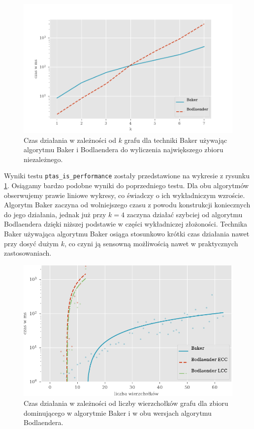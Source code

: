 \documentclass[twoside,a4paper,12pt]{report} %
\theoremstyle{break}
\begin{document}
\begin{figure}[h!]
    \centering
    \includegraphics{wykresy/is_ptas.pdf}
    \caption{Czas działania w zależności od $k$ grafu dla techniki Baker używając algorytmu Baker i Bodlaendera do wyliczenia największego zbioru niezależnego.}
    \label{is_ptas}
\end{figure}

Wyniki testu \texttt{ptas\_is\_performance} zostały przedstawione na wykresie z rysunku \ref{is_ptas}. Osiągamy bardzo podobne wyniki do poprzedniego testu. Dla obu algorytmów obserwujemy prawie liniowe wykresy, co świadczy o ich wykładniczym wzroście. Algorytm Baker zaczyna od wolniejszego czasu z powodu konstrukcji koniecznych do jego działania, jednak już przy $k=4$ zaczyna działać szybciej od algorytmu Bodlaendera dzięki niższej podstawie w części wykładniczej złożoności. Technika Baker używająca algorytmu Baker osiąga stosunkowo krótki czas działania nawet przy dosyć dużym $k$, co czyni ją sensowną możliwością nawet w praktycznych zastosowaniach. 

\begin{figure}[h!]
    \centering
    \includegraphics{wykresy/ds_n.pdf}
    \caption{Czas działania w zależności od liczby wierzchołków grafu dla zbioru dominującego w algorytmie Baker i w obu wersjach algorytmu Bodlaendera.}
    \label{ds_n}
\end{figure}
\end{document}
